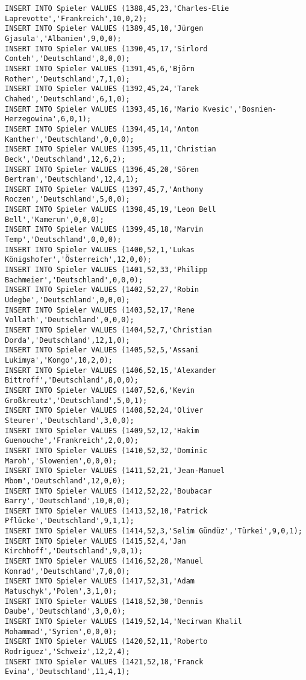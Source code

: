 \documentclass{bschlangaul-aufgabe}
\begin{document}
\begin{verbatim}
INSERT INTO Spieler VALUES (1388,45,23,'Charles-Elie Laprevotte','Frankreich',10,0,2);
INSERT INTO Spieler VALUES (1389,45,10,'Jürgen Gjasula','Albanien',9,0,0);
INSERT INTO Spieler VALUES (1390,45,17,'Sirlord Conteh','Deutschland',8,0,0);
INSERT INTO Spieler VALUES (1391,45,6,'Björn Rother','Deutschland',7,1,0);
INSERT INTO Spieler VALUES (1392,45,24,'Tarek Chahed','Deutschland',6,1,0);
INSERT INTO Spieler VALUES (1393,45,16,'Mario Kvesic','Bosnien-Herzegowina',6,0,1);
INSERT INTO Spieler VALUES (1394,45,14,'Anton Kanther','Deutschland',0,0,0);
INSERT INTO Spieler VALUES (1395,45,11,'Christian Beck','Deutschland',12,6,2);
INSERT INTO Spieler VALUES (1396,45,20,'Sören Bertram','Deutschland',12,4,1);
INSERT INTO Spieler VALUES (1397,45,7,'Anthony Roczen','Deutschland',5,0,0);
INSERT INTO Spieler VALUES (1398,45,19,'Leon Bell Bell','Kamerun',0,0,0);
INSERT INTO Spieler VALUES (1399,45,18,'Marvin Temp','Deutschland',0,0,0);
INSERT INTO Spieler VALUES (1400,52,1,'Lukas Königshofer','Österreich',12,0,0);
INSERT INTO Spieler VALUES (1401,52,33,'Philipp Bachmeier','Deutschland',0,0,0);
INSERT INTO Spieler VALUES (1402,52,27,'Robin Udegbe','Deutschland',0,0,0);
INSERT INTO Spieler VALUES (1403,52,17,'Rene Vollath','Deutschland',0,0,0);
INSERT INTO Spieler VALUES (1404,52,7,'Christian Dorda','Deutschland',12,1,0);
INSERT INTO Spieler VALUES (1405,52,5,'Assani Lukimya','Kongo',10,2,0);
INSERT INTO Spieler VALUES (1406,52,15,'Alexander Bittroff','Deutschland',8,0,0);
INSERT INTO Spieler VALUES (1407,52,6,'Kevin Großkreutz','Deutschland',5,0,1);
INSERT INTO Spieler VALUES (1408,52,24,'Oliver Steurer','Deutschland',3,0,0);
INSERT INTO Spieler VALUES (1409,52,12,'Hakim Guenouche','Frankreich',2,0,0);
INSERT INTO Spieler VALUES (1410,52,32,'Dominic Maroh','Slowenien',0,0,0);
INSERT INTO Spieler VALUES (1411,52,21,'Jean-Manuel Mbom','Deutschland',12,0,0);
INSERT INTO Spieler VALUES (1412,52,22,'Boubacar Barry','Deutschland',10,0,0);
INSERT INTO Spieler VALUES (1413,52,10,'Patrick Pflücke','Deutschland',9,1,1);
INSERT INTO Spieler VALUES (1414,52,3,'Selim Gündüz','Türkei',9,0,1);
INSERT INTO Spieler VALUES (1415,52,4,'Jan Kirchhoff','Deutschland',9,0,1);
INSERT INTO Spieler VALUES (1416,52,28,'Manuel Konrad','Deutschland',7,0,0);
INSERT INTO Spieler VALUES (1417,52,31,'Adam Matuschyk','Polen',3,1,0);
INSERT INTO Spieler VALUES (1418,52,30,'Dennis Daube','Deutschland',3,0,0);
INSERT INTO Spieler VALUES (1419,52,14,'Necirwan Khalil Mohammad','Syrien',0,0,0);
INSERT INTO Spieler VALUES (1420,52,11,'Roberto Rodriguez','Schweiz',12,2,4);
INSERT INTO Spieler VALUES (1421,52,18,'Franck Evina','Deutschland',11,4,1);

\end{verbatim}
\end{document}
